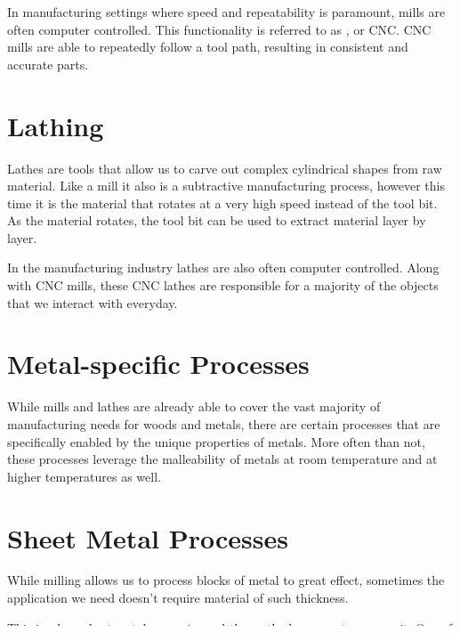 In manufacturing settings where speed and repeatability is paramount, mills are often computer controlled. This functionality is referred to as , or CNC. CNC mills are able to repeatedly follow a tool path, resulting in consistent and accurate parts.

\section{Lathing}

Lathes are tools that allow us to carve out complex cylindrical shapes from raw material. Like a mill it also is a subtractive manufacturing process, however this time it is the material that rotates at a very high speed instead of the tool bit. As the material rotates, the tool bit can be used to extract material layer by layer. 


In the manufacturing industry lathes are also often computer controlled. Along with CNC mills, these CNC lathes are responsible for a majority of the objects that we interact with everyday.

\section{Metal-specific Processes}

While mills and lathes are already able to cover the vast majority of manufacturing needs for woods and metals, there are certain processes that are specifically enabled by the unique properties of metals. More often than not, these processes leverage the malleability of metals at room temperature and at higher temperatures as well.

\section{Sheet Metal Processes}

While milling allows us to process blocks of metal to great effect, sometimes the application we need doesn’t require material of such thickness.

This is where sheet metal comes in, and the methods we use to process it. One of the most common in manufacturing is rolling, where a raw sheet is gradually rolled into the desired shape. This method is used to create many objects you may recognize, such as metal roofings, aircraft frames, and more.

